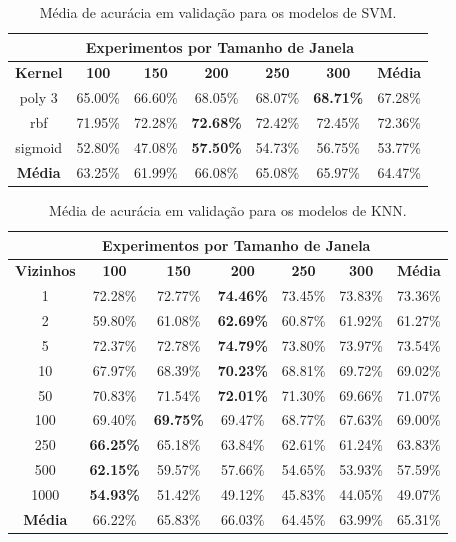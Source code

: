 \begin{table}[H]
\scriptsize
\centering
\caption{Média de acurácia em validação para os modelos de SVM.} 
\label{table:svm_results_tipo_superficie_1}
\begin{tabular}{ccccccc}
\cmidrule(lr){2-6}
& \multicolumn{5}{c}{\textbf{Experimentos por Tamanho de Janela}} & \multicolumn{1}{c}{} \\ \midrule
\textbf{Kernel} & \textbf{100} & \textbf{150} & \textbf{200} & \textbf{250} & \textbf{300} & \textbf{Média} \\ \midrule
poly 3 & 65.00\% & 66.60\% & 68.05\% & 68.07\% & \textbf{68.71\%} & 67.28\% \\ \midrule
rbf & 71.95\% & 72.28\% & \cellcolor[HTML]{34FF34}\textbf{72.68\%} & 72.42\% & 72.45\% & 72.36\% \\ \midrule
sigmoid & 52.80\% & 47.08\% & \textbf{57.50\%} & 54.73\% & 56.75\% & 53.77\% \\ \midrule
\textbf{Média} & 63.25\% & 61.99\% & 66.08\% & 65.08\% & 65.97\% & 64.47\% \\ \bottomrule
\end{tabular}
\end{table}

\begin{table}[H]
\scriptsize
\centering
\caption{Média de acurácia em validação para os modelos de KNN.} 
\label{table:knn_results_tipo_superficie_1}
\begin{tabular}{ccccccc}
\cmidrule(lr){2-6}
& \multicolumn{5}{c}{\textbf{Experimentos por Tamanho de Janela}} & \multicolumn{1}{c}{} \\ \midrule
\textbf{Vizinhos} & \textbf{100} & \textbf{150} & \textbf{200} & \textbf{250} & \textbf{300} & \textbf{Média} \\ \midrule
1 & 72.28\% & 72.77\% & \textbf{74.46\%} & 73.45\% & 73.83\% & 73.36\% \\ \midrule
2 & 59.80\% & 61.08\% & \textbf{62.69\%} & 60.87\% & 61.92\% & 61.27\% \\ \midrule
5 & 72.37\% & 72.78\% & \cellcolor[HTML]{34FF34}\textbf{74.79\%} & 73.80\% & 73.97\% & 73.54\% \\ \midrule
10 & 67.97\% & 68.39\% & \textbf{70.23\%} & 68.81\% & 69.72\% & 69.02\% \\ \midrule
50 & 70.83\% & 71.54\% & \textbf{72.01\%} & 71.30\% & 69.66\% & 71.07\% \\ \midrule
100 & 69.40\% & \textbf{69.75\%} & 69.47\% & 68.77\% & 67.63\% & 69.00\% \\ \midrule
250 & \textbf{66.25\%} & 65.18\% & 63.84\% & 62.61\% & 61.24\% & 63.83\%\\ \midrule
500 & \textbf{62.15\%} & 59.57\% & 57.66\% & 54.65\% & 53.93\% & 57.59\% \\ \midrule
1000 & \textbf{54.93\%} & 51.42\% & 49.12\% & 45.83\% & 44.05\% & 49.07\% \\ \midrule
\textbf{Média} & 66.22\% & 65.83\% & 66.03\% & 64.45\% & 63.99\% & 65.31\% \\ \bottomrule
\end{tabular}
\end{table}

